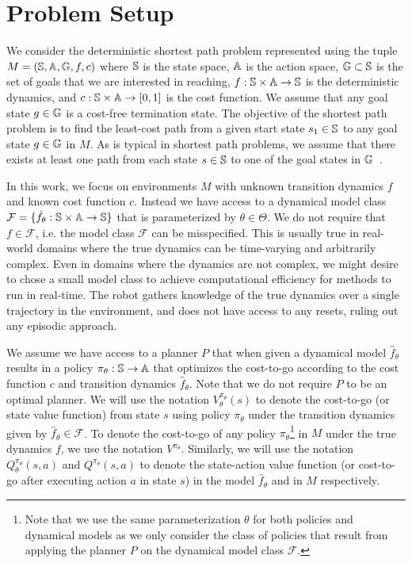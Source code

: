 \section{Problem Setup}
\label{sec:problem-setup-1}

We consider the deterministic shortest path problem represented using
the tuple $M = (\mathbb{S}, \mathbb{A}, \mathbb{G}, f, c)$ where
$\mathbb{S}$ is the state space, $\mathbb{A}$ is the action space,
$\mathbb{G} \subset \mathbb{S}$ is the set of goals that we are
interested in reaching, $f: \mathbb{S} \times \mathbb{A}
\rightarrow \mathbb{S}$ is the deterministic dynamics, and $c:
\mathbb{S} \times \mathbb{A} \rightarrow [0, 1]$ is the cost
function. We assume that any goal state $g \in \mathbb{G}$ is a
cost-free termination state. The objective of the shortest path
problem is to find the least-cost path from a given start state $s_1
\in \mathbb{S}$ to any goal state $g \in \mathbb{G}$ in $M$. As is
typical in shortest path problems, we assume that there exists at
least one path from each state $s \in \mathbb{S}$ to one of the goal
states in $\mathbb{G}$~\cite{DBLP:books/lib/Bertsekas05}.

In this work, we focus on environments $M$ with unknown transition
dynamics $f$ and known cost function $c$. Instead we have access to a
dynamical model class 
$\mathcal{F} = \{\hat{f}_\theta: \mathbb{S} \times \mathbb{A} \rightarrow
\mathbb{S} \}$ that is parameterized by $\theta \in \Theta$. We do
not require that $f \in \mathcal{F}$, i.e. the model class
$\mathcal{F}$ can be misspecified. This is usually true in real-world
domains where the true dynamics can be time-varying and arbitrarily
complex. Even in domains where the dynamics are not complex, we might
desire to chose a small model class to achieve computational
efficiency for methods to run in real-time. The robot gathers
knowledge of the true dynamics over a single trajectory in the
environment, and does not have access to any resets, ruling out any
episodic approach.

We assume we have access to a planner $P$ that when given a dynamical
model $\hat{f}_\theta$ results in a policy $\pi_\theta: \mathbb{S} \rightarrow
\mathbb{A}$ that optimizes 
the cost-to-go according to the cost function $c$ and transition
dynamics $\hat{f}_\theta$. Note that we do not require $P$ to be an
optimal planner. We will use the notation $V_\theta^{\pi_\theta}(s)$ to denote
the cost-to-go (or state value function) from state $s$ using policy
$\pi_\theta$ under the transition 
dynamics given by $\hat{f}_\theta \in \mathcal{F}$. To denote the
cost-to-go of any policy $\pi_\theta$\footnote{Note that we use the
  same parameterization $\theta$ for both policies and dynamical
  models as we only consider the class of policies that result from
  applying the planner $P$ on the dynamical model class
  $\mathcal{F}$.} in $M$ under the true dynamics $f$, we use the
notation $V^{\pi_\theta}$. Similarly, we will use the notation
$Q_\theta^{\pi_\theta}(s, a)$ and $Q^{\pi_\theta}(s, a)$ to denote the
state-action value function (or cost-to-go after executing action $a$
in state $s$) in the model $\hat{f}_\theta$ and in $M$ respectively.

